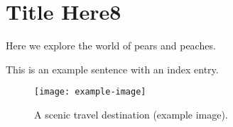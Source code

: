 \newpage
\chapter{Title Here8}




Here we explore the world of pears and peaches.




This is an example sentence with an index entry.
\lipsum[1]  %
\begin{figure}[htbp]
  \centering
  \texttt{[image: example-image]} %
  \caption{A scenic travel destination (example image).}
\end{figure}
\lipsum[1]  %
\lipsum[2]  %




